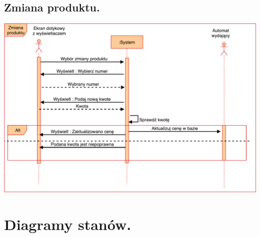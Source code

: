\documentclass[11pt]{article}
\begin{document}
		\subsection{Zmiana produktu.}
		\begin{center}
			\includegraphics[scale=0.65]{ZmianaProduktu.pdf}
		\end{center}
		\newpage
	\section{Diagramy stanów.}
\end{document}
